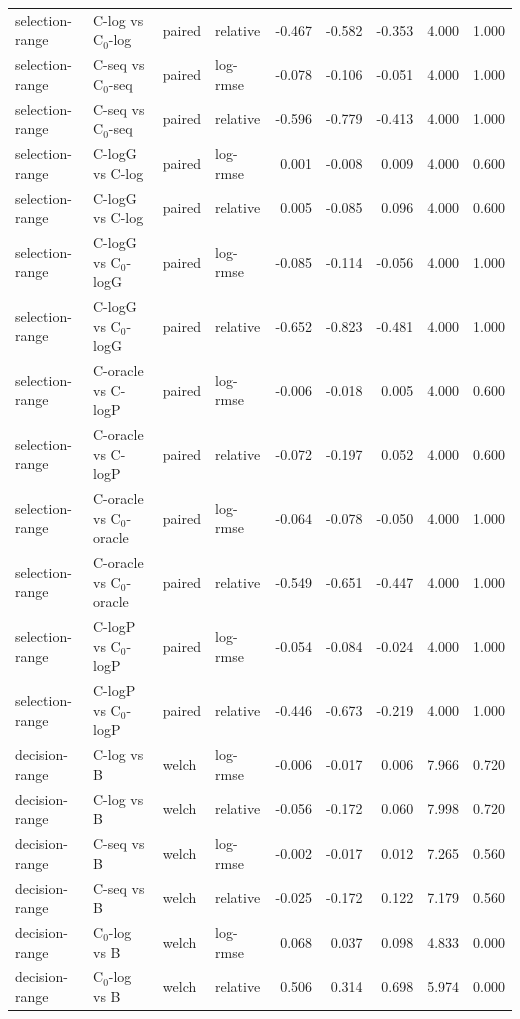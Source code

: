 \begin{longtable}{llllrrrrr}
selection-range & C-log vs C$_0$-log & paired & relative & -0.467 & -0.582 & -0.353 & 4.000 & 1.000 \\
selection-range & C-seq vs C$_0$-seq & paired & log-rmse & -0.078 & -0.106 & -0.051 & 4.000 & 1.000 \\
selection-range & C-seq vs C$_0$-seq & paired & relative & -0.596 & -0.779 & -0.413 & 4.000 & 1.000 \\
selection-range & C-logG vs C-log & paired & log-rmse & 0.001 & -0.008 & 0.009 & 4.000 & 0.600 \\
selection-range & C-logG vs C-log & paired & relative & 0.005 & -0.085 & 0.096 & 4.000 & 0.600 \\
selection-range & C-logG vs C$_0$-logG & paired & log-rmse & -0.085 & -0.114 & -0.056 & 4.000 & 1.000 \\
selection-range & C-logG vs C$_0$-logG & paired & relative & -0.652 & -0.823 & -0.481 & 4.000 & 1.000 \\
selection-range & C-oracle vs C-logP & paired & log-rmse & -0.006 & -0.018 & 0.005 & 4.000 & 0.600 \\
selection-range & C-oracle vs C-logP & paired & relative & -0.072 & -0.197 & 0.052 & 4.000 & 0.600 \\
selection-range & C-oracle vs C$_0$-oracle & paired & log-rmse & -0.064 & -0.078 & -0.050 & 4.000 & 1.000 \\
selection-range & C-oracle vs C$_0$-oracle & paired & relative & -0.549 & -0.651 & -0.447 & 4.000 & 1.000 \\
selection-range & C-logP vs C$_0$-logP & paired & log-rmse & -0.054 & -0.084 & -0.024 & 4.000 & 1.000 \\
selection-range & C-logP vs C$_0$-logP & paired & relative & -0.446 & -0.673 & -0.219 & 4.000 & 1.000 \\
decision-range & C-log vs B & welch & log-rmse & -0.006 & -0.017 & 0.006 & 7.966 & 0.720 \\
decision-range & C-log vs B & welch & relative & -0.056 & -0.172 & 0.060 & 7.998 & 0.720 \\
decision-range & C-seq vs B & welch & log-rmse & -0.002 & -0.017 & 0.012 & 7.265 & 0.560 \\
decision-range & C-seq vs B & welch & relative & -0.025 & -0.172 & 0.122 & 7.179 & 0.560 \\
decision-range & C$_0$-log vs B & welch & log-rmse & 0.068 & 0.037 & 0.098 & 4.833 & 0.000 \\
decision-range & C$_0$-log vs B & welch & relative & 0.506 & 0.314 & 0.698 & 5.974 & 0.000 \\

\end{longtable}
